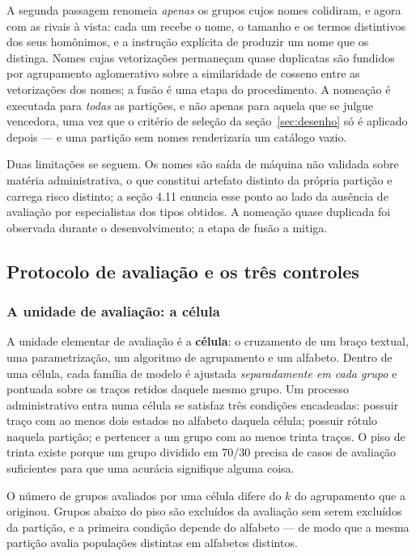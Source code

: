 A segunda passagem renomeia \emph{apenas} os grupos cujos nomes colidiram, e agora com as rivais à
vista: cada um recebe o nome, o tamanho e os termos distintivos dos seus homônimos, e a instrução
explícita de produzir um nome que os distinga. Nomes cujas vetorizações permaneçam quase duplicatas
são fundidos por agrupamento aglomerativo sobre a similaridade de cosseno entre as vetorizações dos
nomes; a fusão é uma etapa do procedimento. A nomeação é executada para \emph{todas} as partições, e não apenas para aquela que se
julgue vencedora, uma vez que o critério de seleção da seção~\ref{sec:desenho} só é aplicado depois
--- e uma partição sem nomes renderizaria um catálogo vazio.

Duas limitações se seguem. Os nomes são saída de máquina
não validada sobre matéria administrativa, o que constitui artefato distinto da própria partição e
carrega risco distinto; a seção 4.11 enuncia esse ponto ao lado da ausência de avaliação por
especialistas dos tipos obtidos. A nomeação quase duplicada foi observada durante o
desenvolvimento; a etapa de fusão a mitiga.

\subsection{Protocolo de avaliação e os três controles}\label{sec:protocolo}

\subsubsection*{A unidade de avaliação: a célula}

A unidade elementar de avaliação é a \textbf{célula}: o cruzamento de um braço textual, uma
parametrização, um algoritmo de agrupamento e um alfabeto. Dentro de uma célula, cada família de
modelo é ajustada \emph{separadamente em cada grupo} e pontuada sobre os traços retidos daquele
mesmo grupo. Um processo administrativo entra numa célula se satisfaz três condições encadeadas:
possuir traço com ao menos dois estados no alfabeto daquela célula; possuir rótulo naquela partição;
e pertencer a um grupo com ao menos trinta traços. O piso de trinta existe porque um grupo dividido
em 70/30 precisa de casos de avaliação suficientes para que uma acurácia signifique alguma coisa.

O número de grupos avaliados por uma célula difere do $k$ do agrupamento que a originou. Grupos
abaixo do piso são excluídos da avaliação sem serem excluídos da partição, e a primeira condição depende do
alfabeto --- de modo que a mesma partição avalia populações distintas em alfabetos distintos.

